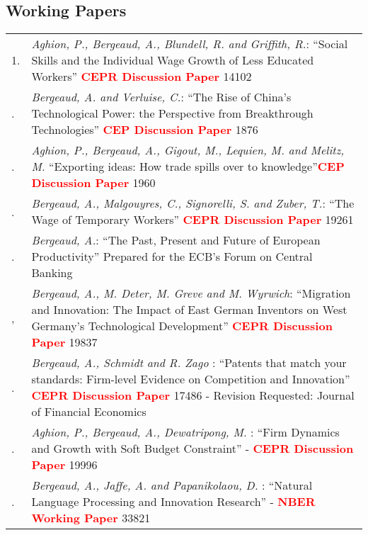 \documentclass[12pt]{article}
\begin{document}
\subsection*{Working Papers}
\begin{footnotesize}
\begin{tabular}{p{1cm}p{14cm}}
1. & \emph{Aghion, P., Bergeaud, A., Blundell, R. and Griffith, R.}: ``Social Skills and the Individual Wage Growth of Less Educated Workers'' \textbf{\textcolor{red}{CEPR Discussion Paper}} 14102 \\
\cr
2. & \emph{Bergeaud, A. and Verluise, C.}: ``The Rise of China's Technological Power: the Perspective from Breakthrough Technologies'' \textbf{\textcolor{red}{CEP Discussion Paper}} 1876 \\
\cr 
3. & \emph{Aghion, P., Bergeaud, A., Gigout, M., Lequien, M. and Melitz, M.} ``Exporting ideas: How trade spills over to knowledge''\textbf{\textcolor{red}{CEP Discussion Paper}} 1960 \\
\cr
4. & \emph{Bergeaud, A., Malgouyres, C., Signorelli, S. and Zuber, T.}: ``The Wage of Temporary Workers''  \textbf{\textcolor{red}{CEPR Discussion Paper}} 19261 \\
\cr 
5. & \emph{Bergeaud, A.}: ``The Past, Present and Future of European Productivity'' Prepared for the ECB's Forum on Central Banking \\
\cr
6, & \emph{Bergeaud, A., M. Deter, M. Greve and M. Wyrwich}: ``Migration and Innovation: The Impact of East German Inventors on West Germany’s Technological Development''  \textbf{\textcolor{red}{CEPR Discussion Paper}} 19837 \\
\cr 
7. & \emph{Bergeaud, A., Schmidt and R. Zago} : ``Patents that match your standards: Firm-level Evidence on Competition and Innovation'' \textbf{\textcolor{red}{CEPR Discussion Paper}}  17486 - Revision Requested: Journal of Financial Economics \\
\cr
8. & \emph{Aghion, P., Bergeaud, A., Dewatripong, M. } : ``Firm Dynamics and Growth with Soft Budget Constraint'' - \textbf{\textcolor{red}{CEPR Discussion Paper}} 19996 \\
\cr
9. & \emph{Bergeaud, A., Jaffe, A. and Papanikolaou, D.} : ``Natural Language Processing and Innovation Research'' - \textbf{\textcolor{red}{NBER Working Paper}} 33821

 



\end{tabular}
\end{footnotesize}
\end{document}
